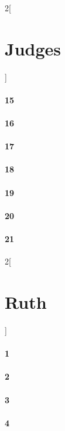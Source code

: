 \documentclass{book}
\begin{document}
\begin{multicols}{2}[\part{Judges}]
\subsection*{15}
\subsection*{16}
\subsection*{17}
\subsection*{18}
\subsection*{19}
\subsection*{20}
\subsection*{21}
\end{multicols}
\begin{multicols}{2}[\part{Ruth}]
\subsection*{1}
\subsection*{2}
\subsection*{3}
\subsection*{4}
\end{multicols}
\end{document}

